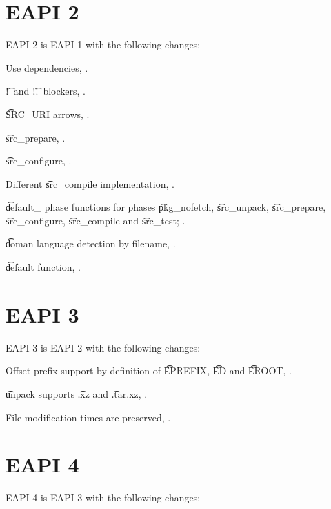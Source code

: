 \section*{EAPI 2}

EAPI 2 is EAPI 1 with the following changes:

\begin{compactitem}
\item Use dependencies, .
\item \t{!}\ and \t{!!}\ blockers, .
\item \t{SRC\_URI} arrows, .
\item \t{src\_prepare}, .
\item \t{src\_configure}, .
\item Different \t{src\_compile} implementation, .
\item \t{default\_} phase functions for phases \t{pkg\_nofetch}, \t{src\_unpack}, \t{src\_prepare},
    \t{src\_configure}, \t{src\_compile} and \t{src\_test}; .
\item \t{doman} language detection by filename, .
\item \t{default} function, .
\end{compactitem}

\section*{EAPI 3}

EAPI 3 is EAPI 2 with the following changes:
\begin{compactitem}
\item Offset-prefix support by definition of \t{EPREFIX}, \t{ED} and \t{EROOT},
    .
\item \t{unpack} supports \t{.xz} and \t{.tar.xz}, .
\item File modification times are preserved, .
\end{compactitem}

\section*{EAPI 4}

EAPI 4 is EAPI 3 with the following changes:

